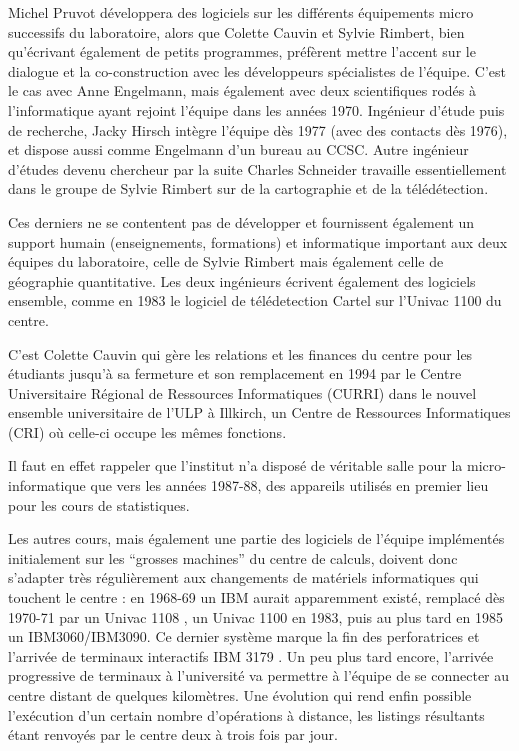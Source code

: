Michel Pruvot développera des logiciels sur les différents équipements micro successifs du laboratoire, alors que Colette Cauvin et Sylvie Rimbert, bien qu'écrivant également de petits programmes, préfèrent mettre l'accent sur le dialogue et la co-construction avec les développeurs spécialistes de l'équipe. C'est le cas avec Anne Engelmann, mais également avec deux scientifiques rodés à l'informatique ayant rejoint l'équipe dans les années 1970. Ingénieur d'étude puis de recherche, Jacky Hirsch intègre l'équipe dès 1977 (avec des contacts dès 1976), et dispose aussi comme Engelmann d'un bureau au CCSC. Autre ingénieur d'études devenu chercheur par la suite Charles Schneider travaille essentiellement dans le groupe de Sylvie Rimbert sur de la cartographie et de la télédétection.

Ces derniers ne se contentent pas de développer et fournissent également un support humain (enseignements, formations) et informatique important aux deux équipes du laboratoire, celle de Sylvie Rimbert mais également celle de géographie quantitative. Les deux ingénieurs écrivent également des logiciels ensemble, comme en 1983 le logiciel de télédetection Cartel sur l'Univac 1100 du centre.

C'est Colette Cauvin qui gère les relations et les finances du centre pour les étudiants jusqu'à sa fermeture et son remplacement en 1994 par le Centre Universitaire Régional de Ressources Informatiques (CURRI) dans le nouvel ensemble universitaire de l'ULP à Illkirch, un Centre de Ressources Informatiques (CRI) où celle-ci occupe les mêmes fonctions.

Il faut en effet rappeler que l'institut n'a disposé de véritable salle pour la micro-informatique que vers les années 1987-88, des appareils utilisés en premier lieu pour les cours de statistiques.

Les autres cours, mais également une partie des logiciels de l'équipe implémentés initialement sur les \enquote{grosses machines} du centre de calculs, doivent donc s'adapter très régulièrement aux changements de matériels informatiques qui touchent le centre : en 1968-69 un IBM aurait apparemment existé, remplacé dès 1970-71 par un Univac 1108 \textcite{Dalmasso1971}, un Univac 1100 en 1983, puis au plus tard en 1985 un IBM3060/IBM3090. Ce dernier système marque la fin des perforatrices et l'arrivée de terminaux interactifs IBM 3179 \autocites{Rimbert1984,Cauvin1986}. Un peu plus tard encore, l'arrivée progressive de terminaux à l'université va permettre à l'équipe de se connecter au centre distant de quelques kilomètres. Une évolution qui rend enfin possible l'exécution d'un certain nombre d'opérations à distance, les listings résultants étant renvoyés par le centre deux à trois fois par jour.

